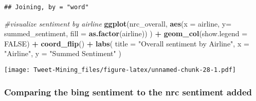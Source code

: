\documentclass[
]{article}
\newenvironment{Shaded}{\begin{snugshade}}{\end{snugshade}}
\newcommand{\CommentTok}[1]{\textcolor[rgb]{0.56,0.35,0.01}{\textit{#1}}}
\newcommand{\DataTypeTok}[1]{\textcolor[rgb]{0.13,0.29,0.53}{#1}}
\newcommand{\KeywordTok}[1]{\textcolor[rgb]{0.13,0.29,0.53}{\textbf{#1}}}
\newcommand{\NormalTok}[1]{#1}
\newcommand{\OperatorTok}[1]{\textcolor[rgb]{0.81,0.36,0.00}{\textbf{#1}}}
\newcommand{\OtherTok}[1]{\textcolor[rgb]{0.56,0.35,0.01}{#1}}
\newcommand{\StringTok}[1]{\textcolor[rgb]{0.31,0.60,0.02}{#1}}
\begin{document}
\begin{Shaded}
\end{Shaded}

\begin{verbatim}
## Joining, by = "word"
\end{verbatim}

\begin{Shaded}
\begin{Highlighting}[]
\CommentTok{#visualize sentiment by airline}
\KeywordTok{ggplot}\NormalTok{(nrc_overall,}
  \KeywordTok{aes}\NormalTok{(}\DataTypeTok{x =}\NormalTok{ airline, }\DataTypeTok{y=}\NormalTok{ summed_sentiment, }\DataTypeTok{fill =} \KeywordTok{as.factor}\NormalTok{(airline))}
\NormalTok{) }\OperatorTok{+}\StringTok{ }
\StringTok{  }\KeywordTok{geom_col}\NormalTok{(}\DataTypeTok{show.legend =} \OtherTok{FALSE}\NormalTok{) }\OperatorTok{+}
\StringTok{  }\KeywordTok{coord_flip}\NormalTok{() }\OperatorTok{+}
\StringTok{  }\KeywordTok{labs}\NormalTok{(}
    \DataTypeTok{title =} \StringTok{"Overall sentiment by Airline"}\NormalTok{,}
    \DataTypeTok{x =} \StringTok{"Airline"}\NormalTok{,}
    \DataTypeTok{y =} \StringTok{"Summed Sentiment"}
\NormalTok{  )}
\end{Highlighting}
\end{Shaded}

\texttt{[image: Tweet-Mining\_files/figure-latex/unnamed-chunk-28-1.pdf]}

\hypertarget{comparing-the-bing-sentiment-to-the-nrc-sentiment-added}{%
\subsubsection{Comparing the bing sentiment to the nrc sentiment
added}\label{comparing-the-bing-sentiment-to-the-nrc-sentiment-added}}
\end{document}
